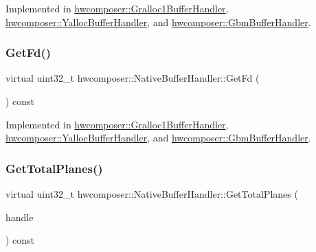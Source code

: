 Implemented in \mbox{\hyperlink{classhwcomposer_1_1Gralloc1BufferHandler_aac10a3d48f5dab43e3057ef9783bd6ea}{hwcomposer\+::\+Gralloc1\+Buffer\+Handler}}, \mbox{\hyperlink{classhwcomposer_1_1YallocBufferHandler_ae82e3553b77e8dfd8cbe2e30e7a153a3}{hwcomposer\+::\+Yalloc\+Buffer\+Handler}}, and \mbox{\hyperlink{classhwcomposer_1_1GbmBufferHandler_a0786f7b82b504105c71881eced9b5270}{hwcomposer\+::\+Gbm\+Buffer\+Handler}}.

\mbox{\label{classhwcomposer_1_1NativeBufferHandler_adb5a4c6d14c012f8a5c71fbb2c984438}} 
\subsubsection{\texorpdfstring{Get\+Fd()}{GetFd()}}
{\footnotesize\ttfamily virtual uint32\+\_\+t hwcomposer\+::\+Native\+Buffer\+Handler\+::\+Get\+Fd (\begin{DoxyParamCaption}{ }\end{DoxyParamCaption}) const\hspace{0.3cm}{\ttfamily [pure virtual]}}



Implemented in \mbox{\hyperlink{classhwcomposer_1_1Gralloc1BufferHandler_aee03106dfff3a4b68b2a29a0d0350d07}{hwcomposer\+::\+Gralloc1\+Buffer\+Handler}}, \mbox{\hyperlink{classhwcomposer_1_1YallocBufferHandler_a793b507e933f4cd256ea37e302152bb4}{hwcomposer\+::\+Yalloc\+Buffer\+Handler}}, and \mbox{\hyperlink{classhwcomposer_1_1GbmBufferHandler_ac204254aef6007d09474f8e76f9b6470}{hwcomposer\+::\+Gbm\+Buffer\+Handler}}.

\mbox{\label{classhwcomposer_1_1NativeBufferHandler_a3b4115de8c13c53b6cd233f755f46dc9}} 
\subsubsection{\texorpdfstring{Get\+Total\+Planes()}{GetTotalPlanes()}}
{\footnotesize\ttfamily virtual uint32\+\_\+t hwcomposer\+::\+Native\+Buffer\+Handler\+::\+Get\+Total\+Planes (\begin{DoxyParamCaption}\item[{\mbox{\hyperlink{alios_2platformdefines_8h_ac0a2eaf260f556d17fe489911f017bdf}{H\+W\+C\+Native\+Handle}}}]{handle }\end{DoxyParamCaption}) const\hspace{0.3cm}{\ttfamily [pure virtual]}}



